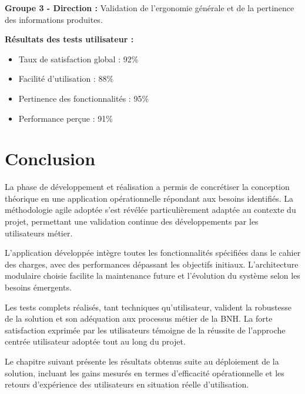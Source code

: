 \textbf{Groupe 3 - Direction :} Validation de l'ergonomie générale et de la pertinence des informations produites.

\textbf{Résultats des tests utilisateur :}
\begin{itemize}
    \item Taux de satisfaction global : 92\%
    \item Facilité d'utilisation : 88\%
    \item Pertinence des fonctionnalités : 95\%
    \item Performance perçue : 91\%
\end{itemize}

\section{Conclusion}

La phase de développement et réalisation a permis de concrétiser la conception théorique en une application opérationnelle répondant aux besoins identifiés. La méthodologie agile adoptée s'est révélée particulièrement adaptée au contexte du projet, permettant une validation continue des développements par les utilisateurs métier.

\medskip

L'application développée intègre toutes les fonctionnalités spécifiées dans le cahier des charges, avec des performances dépassant les objectifs initiaux. L'architecture modulaire choisie facilite la maintenance future et l'évolution du système selon les besoins émergents.

\medskip

Les tests complets réalisés, tant techniques qu'utilisateur, valident la robustesse de la solution et son adéquation aux processus métier de la BNH. La forte satisfaction exprimée par les utilisateurs témoigne de la réussite de l'approche centrée utilisateur adoptée tout au long du projet.

\medskip

Le chapitre suivant présente les résultats obtenus suite au déploiement de la solution, incluant les gains mesurés en termes d'efficacité opérationnelle et les retours d'expérience des utilisateurs en situation réelle d'utilisation.